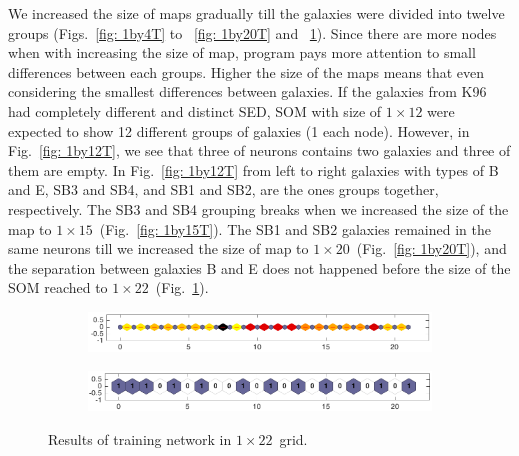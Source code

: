             We increased the size of maps gradually till the galaxies were divided into twelve groups (Figs.~\ref{fig: 1by4T} to ~\ref{fig: 1by20T} and ~\ref{fig: 1by22T}).
            Since there are more nodes when with increasing the size of map, program pays more attention to small differences between each groups.
            Higher the size of the maps means that even considering the smallest differences between galaxies.
            If the galaxies from K96 had completely different and distinct SED, SOM with size of $1\times12$ were expected to show 12 different groups of galaxies (1 each node).
            However, in Fig.~\ref{fig: 1by12T}, we see that three of neurons contains two galaxies and  three of them are empty. 
            In Fig.~\ref{fig: 1by12T} from left to right galaxies with types of B and E, SB3 and SB4, and SB1 and SB2, are the ones groups together, respectively. 
            The SB3 and SB4 grouping breaks when we increased the size of the map to $1\times15$~(Fig.~\ref{fig: 1by15T}).
            The SB1 and SB2 galaxies remained in the same neurons till we increased the size of map to $1\times20$~(Fig.~\ref{fig: 1by20T}), and the separation between galaxies B and E does not happened before the size of the SOM reached to $1\times22$~(Fig.~\ref{fig: 1by22T}).
        \begin{figure}
            \begin{subfigure}[b]{\textwidth}
                \centering
                \includegraphics[width=\textwidth]{../images/1d/apps/dist_1_by_22.png}
            \end{subfigure}
            \hfill
            \begin{subfigure}[b]{\textwidth}
                \includegraphics[width=\textwidth]{../images/1d/apps/hit_t_1_by_22.png}
            \end{subfigure}
            \caption{Results of training network in $1\times22$~grid.}
            \label{fig: 1by22T}
        \end{figure}
    
